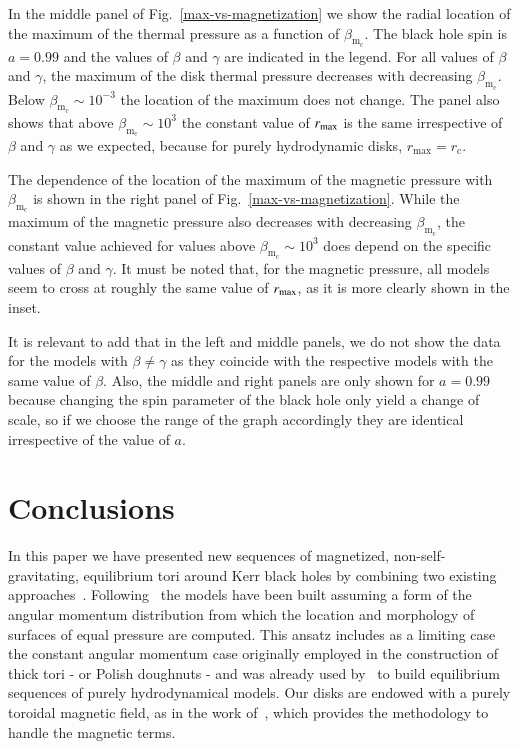 \documentclass{aa}
\begin{document}
In the middle panel of Fig.~\ref{max-vs-magnetization} we show the radial location of the maximum of the thermal pressure as a function of $\beta_{\mathrm{m}_{\mathrm{c}}}
$. The black hole spin is $a=0.99$ and the values of $\beta$ and $\gamma$ are indicated in the legend. For all values of $\beta$ and $\gamma$, the maximum of the disk thermal pressure decreases with decreasing $\beta_{\mathrm{m}_{\mathrm{c}}}
$. Below $\beta_{\mathrm{m}_{\mathrm{c}}}
\sim 10^{-3}$ the location of the maximum does not change. The panel also shows that above $\beta_{\mathrm{m}_{\mathrm{c}}}
\sim 10^{3}$ the constant value of $r_{\rm max}$ is the same irrespective of $\beta$ and $\gamma$ as we expected, because for purely hydrodynamic disks, $r_{\mathrm{max}} = r_{\mathrm{c}}$.

The dependence of the location of the maximum of the magnetic pressure with $\beta_{\mathrm{m}_{\mathrm{c}}}
$ is shown in the right panel of Fig.~\ref{max-vs-magnetization}. While the maximum of the magnetic pressure also decreases with decreasing $\beta_{\mathrm{m}_{\mathrm{c}}}
$, the constant value achieved for values above $\beta_{\mathrm{m}_{\mathrm{c}}}
\sim 10^{3}$ does depend on the specific values of $\beta$ and $\gamma$. It must be noted that, for the magnetic pressure, all models seem to cross at roughly the same value of $r_{\rm max}$, as it is more clearly shown in the inset.

It is relevant to add that in the left and middle panels, we do not show the data for the models with $\beta \neq \gamma$ as they coincide with the respective models with the same value of $\beta$. Also, the middle and right panels are only shown for $a=0.99$ because changing the spin parameter of the black hole only yield a change of scale, so if we choose the range of the graph accordingly they are identical irrespective of the value of $a$. 


\section{Conclusions}
\label{conclusions}

In this paper we have presented new sequences of magnetized, non-self-gravitating, equilibrium tori around Kerr black holes by combining two existing approaches~\citep{Komissarov:2006,Qian:2009}. Following~\citet{Qian:2009} the models have been built assuming a form of the angular momentum distribution from which the location and morphology
of surfaces of equal pressure are computed. This ansatz includes as a limiting case the constant angular momentum case originally employed in the construction of thick tori - or Polish doughnuts - and was already used by~\citet{Qian:2009} to build equilibrium sequences of purely hydrodynamical models. Our disks are endowed with a purely toroidal magnetic field, as in the work of~\citet{Komissarov:2006}, which provides the methodology to handle the magnetic terms.
\end{document}
